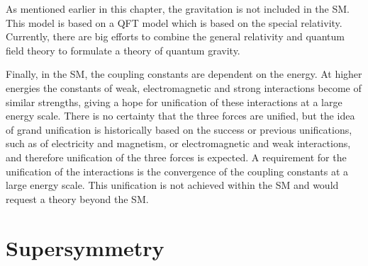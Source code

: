 As mentioned earlier in this chapter, the gravitation is not included in the SM. This model is based on a QFT model which is based on the special relativity. Currently, there are big efforts to combine the general relativity and quantum field theory to formulate a theory of quantum gravity.  

Finally, in the SM, the coupling constants are dependent on the energy. At higher energies the constants of weak, electromagnetic and strong interactions become of similar strengths, giving a hope for unification of these interactions at a large energy scale. There is no certainty that the three forces are unified, but the idea of grand unification is historically based on the success or previous unifications,  such as of electricity and magnetism, or electromagnetic and weak interactions, and  therefore unification of the three forces is expected. A requirement for the unification of the interactions is the convergence of the coupling constants at a large energy scale. This unification is not achieved within the SM and would request a theory beyond the SM.
 





\section{Supersymmetry~\label{sec:SUSY}}

